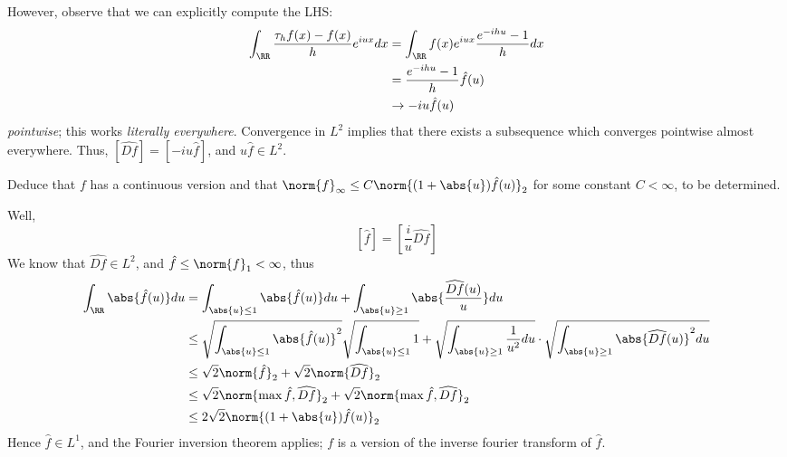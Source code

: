 \documentclass[11pt, headheight=30pt]{scrartcl}
\begin{document}

However, observe that we can explicitly compute the LHS:
\begin{align*}
    \int_\RR \frac{\tau_h f(x) - f(x)}{h} e^{iux} dx
    &= \int_\RR f(x) e^{iux} \frac{e^{-ihu} - 1}{h} dx\\
    &= \frac{e^{-ihu} - 1}{h} \hat{f}(u)\\
    &\to -iu\hat{f}(u)
\end{align*}
\emph{pointwise}; this works \emph{literally everywhere}.
Convergence in $L^2$
implies that there exists a subsequence which converges
pointwise almost everywhere. Thus, $[\widehat{Df}] = [-iu\hat{f}]$,
and $u\hat{f}\in L^2$.


\begin{prob}
    Deduce that $f$ has a
    continuous version and that $\norm{f}_\infty \leq C \norm{(1 + \abs{u})\hat{f}(u)}_2$
    for some constant $C < \infty$, to be determined.
\end{prob}
Well,
\[
    [\hat{f}] = \left[\frac{i}{u} \widehat{Df}\right]    
\]
We know that $\widehat{Df}\in L^2$, and $\hat{f} \leq \norm{f}_1 < \infty$, thus
\begin{align*}
    \int_\RR \abs{\hat{f}(u)}du &= \int_{\abs{u}\leq 1} \abs{\hat{f}(u)} du + \int_{\abs{u}\geq 1}  \abs{\frac{\widehat{Df}(u)}{u}} du\\
    &\leq \sqrt{\int_{\abs{u}\leq 1} \abs{\hat{f}(u)}^2}\sqrt{\int_{\abs{u}\leq 1} 1} + \sqrt{\int_{\abs{u} \geq 1} \frac{1}{u^2} du}\cdot \sqrt{\int_{\abs{u}\geq 1}\abs{\widehat{Df}(u)}^2 du}\\
    &\leq \sqrt{2} \norm{\hat{f}}_2 + \sqrt{2}\norm{\widehat{Df}}_2\\
    &\leq \sqrt{2} \norm{\max{\hat{f}, \widehat{Df}}}_2 + \sqrt{2} \norm{\max{\hat{f}, \widehat{Df}}}_2\\
    &\leq 2\sqrt{2}\norm{(1 + \abs{u})\hat{f}(u)}_2
\end{align*}
Hence $\hat{f}\in L^1$, and the Fourier inversion theorem applies;
$f$ is a version of the inverse fourier transform of $\hat{f}$.
\end{document}
